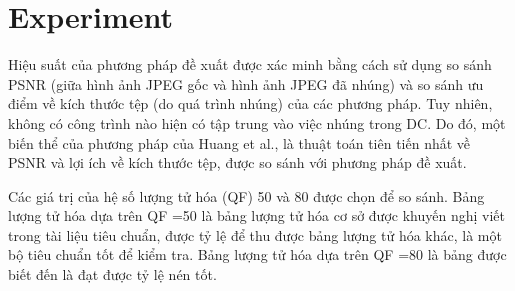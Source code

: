 \section{Experiment}

Hiệu suất của phương pháp đề xuất được xác minh bằng cách sử dụng so sánh PSNR (giữa hình ảnh JPEG gốc và hình ảnh JPEG đã nhúng) và so sánh ưu điểm về kích thước tệp (do quá trình nhúng) của các phương pháp. Tuy nhiên, không có công trình nào hiện có tập trung vào việc nhúng trong DC. Do đó, một biến thể của phương pháp của Huang et al., là thuật toán tiên tiến nhất về PSNR và lợi ích về kích thước tệp, được so sánh với phương pháp đề xuất. 

Các giá trị của hệ số lượng tử hóa (QF) 50 và 80 được chọn để so sánh. Bảng lượng tử hóa dựa trên QF =50 là bảng lượng tử hóa cơ sở được khuyến nghị viết trong tài liệu tiêu chuẩn, được tỷ lệ để thu được bảng lượng tử hóa khác, là một bộ tiêu chuẩn tốt để kiểm tra. Bảng lượng tử hóa dựa trên QF =80 là bảng được biết đến là đạt được tỷ lệ nén tốt. 